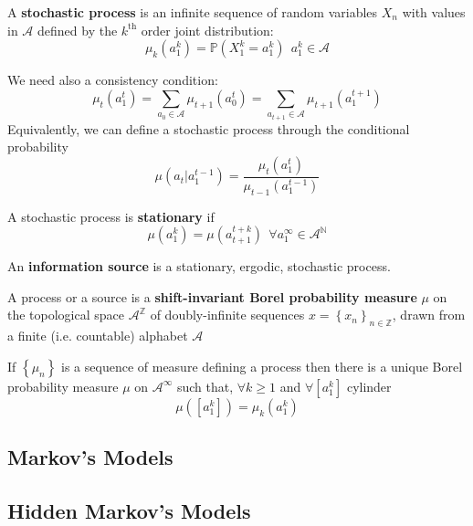 \begin{definition}
    A \textbf{stochastic process} is an infinite sequence of random variables $X_n$ with values in $\mathcal{A}$ defined by the $k^\text{th}$ order joint distribution:
    \begin{equation*}
        \mu_k\left(a_1^k\right) = \mathbb{P}\left(X_1^k = a_1^k\right) \ \ a_1^k \in \mathcal{A}
    \end{equation*}
\end{definition}
We need also a consistency condition:
\begin{equation*}
    \mu_t\left(a_1^t\right) = \sum_{a_0 \in \mathcal{A}} \mu_{t+1}\left(a_0^t\right) = \sum_{a_{t+1} \in \mathcal{A}} \mu_{t+1}\left(a_1^{t+1}\right)
\end{equation*}
Equivalently, we can define a stochastic process through the conditional probability
\begin{equation*}
    \mu\left(a_t \vert a_1^{t-1}\right) = \frac{\mu_t\left(a_1^t\right)}{\mu_{t-1}\left(a_1^{t-1}\right)}
\end{equation*}
\begin{definition}
    A stochastic process is \textbf{stationary} if
    \begin{equation*}
        \mu\left(a_1^k\right) = \mu\left(a_{t+1}^{t+k}\right) \ \ \forall a_1^\infty \in \mathcal{A}^\mathbb{N}
    \end{equation*}
\end{definition}
\begin{definition}
    An \textbf{information source} is a stationary, ergodic, stochastic process.
\end{definition}
\begin{definition}
    A process or a source is a \textbf{shift-invariant Borel probability measure} $\mu$ on the topological space $\mathcal{A}^\mathbb{Z}$ of doubly-infinite sequences $x = \left\{x_n\right\}_{n \in \mathbb{Z}}$, drawn from a finite (i.e. countable) alphabet $\mathcal{A}$
\end{definition}
\begin{theorem}
    If $\left\{\mu_n\right\}$ is a sequence of measure defining a process then there is a unique Borel probability measure $\mu$ on $\mathcal{A}^\infty$ such that, $\forall k \geq 1$ and $\forall \left[a_1^k\right]$ cylinder
    \begin{equation*}
        \mu\left(\left[a_1^k\right]\right) = \mu_k\left(a_1^k\right)
    \end{equation*}
\end{theorem}

\subsection{Markov's Models}

\subsection{Hidden Markov's Models}